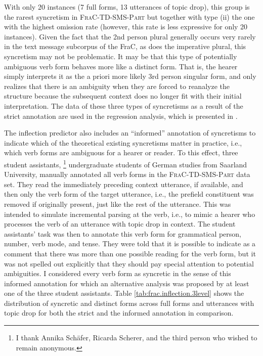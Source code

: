 With only 20 instances (7 full forms, 13 utterances of topic drop), this group is the rarest syncretism in \textsc{FraC-TD-SMS-Part} but together with type (ii) the one with the highest omission rate (however, this rate is less expressive for only 20 instances).
Given the fact that the 2nd person plural generally occurs very rarely in the text message subcorpus of the FraC, as does the imperative  plural, this syncretism may not be problematic.
It may be that this type of potentially ambiguous verb form behaves more like a distinct form.
That is, the hearer simply interprets it as the a priori more likely 3rd person singular form, and only realizes that there is an ambiguity when they are forced to reanalyze the structure because the subsequent context does no longer fit with their initial interpretation.
The data of these three types of syncretisms as a result of the strict annotation are used in the regression analysis, which is presented in .

The inflection predictor also includes an ``informed'' annotation of syncretisms to indicate which of the theoretical existing syncretisms matter in practice, i.e., which verb forms are ambiguous for a hearer or reader.
To this effect, three student assistants,%
\footnote{I thank Annika Schäfer, Ricarda Scherer,  and the third person who wished to remain anonymous.}%
%
undergraduate students of German studies from Saarland University, manually annotated all verb forms in the \textsc{FraC-TD-SMS-Part} data set.
They read the immediately preceding context utterance, if available, and then only the verb form of the target utterance, i.e., the prefield constituent was removed if originally present, just like the rest of the utterance.
This was intended to simulate incremental parsing at the verb, i.e., to mimic a hearer who processes the verb of an utterance with topic drop in context.
The student assistants' task was then to annotate this verb form for grammatical person, number, verb mode, and tense.
They were told that it is possible to indicate as a comment that there was more than one possible reading for the verb form, but it was not spelled out explicitly that they should pay special attention to potential ambiguities. 
I considered every verb form as syncretic in the sense of this informed annotation for which an alternative analysis was proposed by at least one of the three student assistants.
Table \ref{tab:frac.inflection.3level} shows the distribution of syncretic and distinct forms across full forms and utterances with topic drop for both the strict and the informed annotation in comparison.

